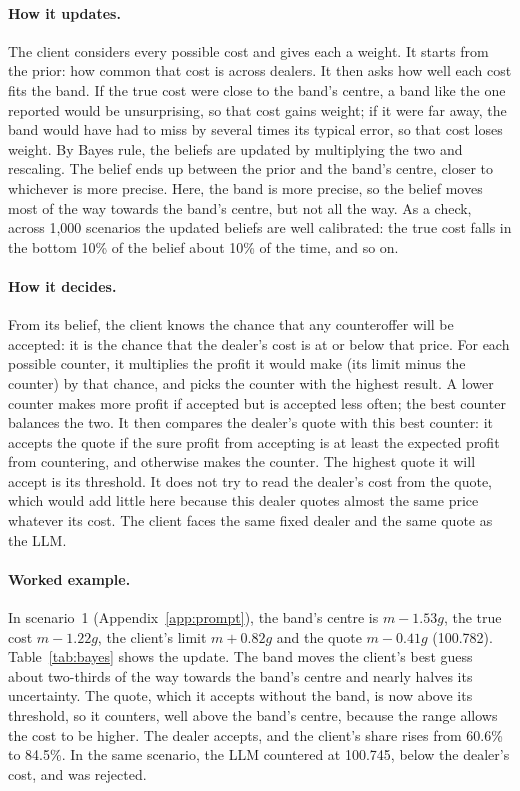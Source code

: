 \documentclass[sigconf]{acmart}
\begin{document}
\paragraph{How it updates.} The client considers every possible cost and gives each a weight. It starts from the prior: how common that cost is across dealers. It then asks how well each cost fits the band. If the true cost were close to the band's centre, a band like the one reported would be unsurprising, so that cost gains weight; if it were far away, the band would have had to miss by several times its typical error, so that cost loses weight. By Bayes rule, the beliefs are updated by multiplying the two and rescaling. The belief ends up between the prior and the band's centre, closer to whichever is more precise. Here, the band is more precise, so the belief moves most of the way towards the band's centre, but not all the way. As a check, across 1,000 scenarios the updated beliefs are well calibrated: the true cost falls in the bottom 10\% of the belief about 10\% of the time, and so on.


\paragraph{How it decides.} From its belief, the client knows the chance that any counteroffer will be accepted: it is the chance that the dealer's cost is at or below that price. For each possible counter, it multiplies the profit it would make (its limit minus the counter) by that chance, and picks the counter with the highest result. A lower counter makes more profit if accepted but is accepted less often; the best counter balances the two. It then compares the dealer's quote with this best counter: it accepts the quote if the sure profit from accepting is at least the expected profit from countering, and otherwise makes the counter. The highest quote it will accept is its threshold. It does not try to read the dealer's cost from the quote, which would add little here because this dealer quotes almost the same price whatever its cost. The client faces the same fixed dealer and the same quote as the LLM.

\paragraph{Worked example.} In scenario~1 (Appendix~\ref{app:prompt}), the band's centre is $m - 1.53g$, the true cost $m - 1.22g$, the client's limit $m + 0.82g$ and the quote $m - 0.41g$ (100.782). Table~\ref{tab:bayes} shows the update. The band moves the client's best guess about two-thirds of the way towards the band's centre and nearly halves its uncertainty. The quote, which it accepts without the band, is now above its threshold, so it counters, well above the band's centre, because the range allows the cost to be higher. The dealer accepts, and the client's share rises from 60.6\% to 84.5\%. In the same scenario, the LLM countered at 100.745, below the dealer's cost, and was rejected.
\end{document}

